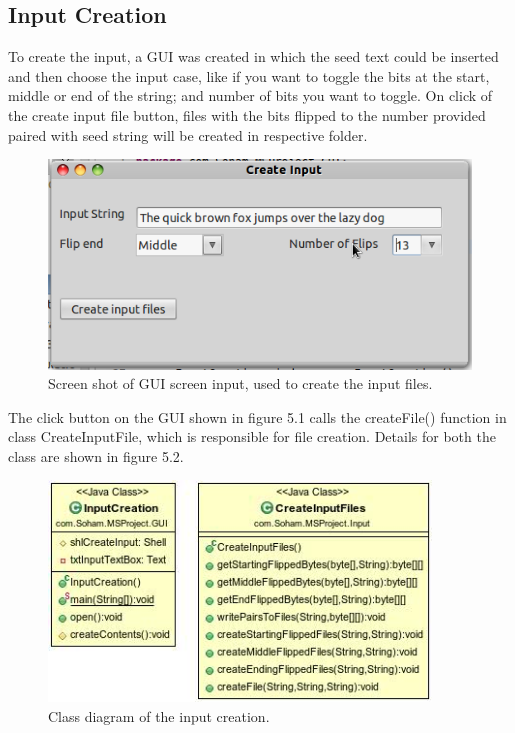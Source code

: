 \subsection{Input Creation}

To create the input, a GUI was created in which the seed text could be inserted and then choose the input case,
like if you want to toggle the bits at the start, middle or end of the string; and number of bits you want
to toggle. On click of the create input file button, files with the bits flipped to the number provided paired
with seed string will be created in respective folder.

\begin{figure}
  \begin{center}
    \includegraphics[width=5.2in]{inputcreationscreenshot.png}
  \end{center}
  \caption{Screen shot of GUI screen input, used to create the input files.}
  \label{fig:screenshotinputcreation}
\end{figure}

The click button on the GUI shown in figure 5.1 calls the createFile() function in class CreateInputFile, which 
is responsible for file creation. Details for both the class are shown in figure 5.2.

\begin{figure}
  \begin{center}
    \includegraphics[width=4in]{Input.jpg}
  \end{center}
  \caption{Class diagram of the input creation.}
  \label{fig:UMLInputCreation}
\end{figure}

